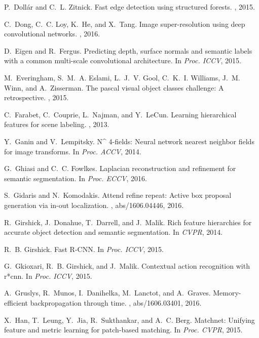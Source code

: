 \documentclass[10pt,twocolumn,letterpaper]{article}
\begin{document}
\begin{thebibliography}{100}
	P.~Doll{\'{a}}r and C.~L. Zitnick.
	\newblock Fast edge detection using structured forests.
	, 2015.
	
	C.~Dong, C.~C. Loy, K.~He, and X.~Tang.
	\newblock Image super-resolution using deep convolutional networks.
	, 2016.
	
	D.~Eigen and R.~Fergus.
	\newblock Predicting depth, surface normals and semantic labels with a common
	multi-scale convolutional architecture.
	\newblock In {\em Proc. {ICCV}}, 2015.
	
	M.~Everingham, S.~M.~A. Eslami, L.~J.~V. Gool, C.~K.~I. Williams, J.~M. Winn,
	and A.~Zisserman.
	\newblock The pascal visual object classes challenge: {A} retrospective.
	, 2015.
	
	C.~Farabet, C.~Couprie, L.~Najman, and Y.~LeCun.
	\newblock Learning hierarchical features for scene labeling.
	, 2013.
	
	Y.~Ganin and V.~Lempitsky.
	\newblock N\^{} 4-fields: Neural network nearest neighbor fields for image
	transforms.
	\newblock In {\em Proc. {ACCV}}, 2014.
	
	G.~Ghiasi and C.~C. Fowlkes.
	\newblock Laplacian reconstruction and refinement for semantic segmentation.
	\newblock In {\em Proc. {ECCV}}, 2016.
	
	S.~Gidaris and N.~Komodakis.
	\newblock Attend refine repeat: Active box proposal generation via in-out
	localization.
	, abs/1606.04446, 2016.
	
	R.~Girshick, J.~Donahue, T.~Darrell, and J.~Malik.
	\newblock Rich feature hierarchies for accurate object detection and semantic
	segmentation.
	\newblock In {\em CVPR}, 2014.
	
	R.~B. Girshick.
	\newblock Fast {R-CNN}.
	\newblock In {\em Proc. {ICCV}}, 2015.
	
	G.~Gkioxari, R.~B. Girshick, and J.~Malik.
	\newblock Contextual action recognition with r*cnn.
	\newblock In {\em Proc. {ICCV}}, 2015.
	
	A.~Gruslys, R.~Munos, I.~Danihelka, M.~Lanctot, and A.~Graves.
	\newblock Memory-efficient backpropagation through time.
	, abs/1606.03401, 2016.
	
	X.~Han, T.~Leung, Y.~Jia, R.~Sukthankar, and A.~C. Berg.
	\newblock Matchnet: Unifying feature and metric learning for patch-based
	matching.
	\newblock In {\em Proc. {CVPR}}, 2015.
	

\end{thebibliography}
\end{document}
